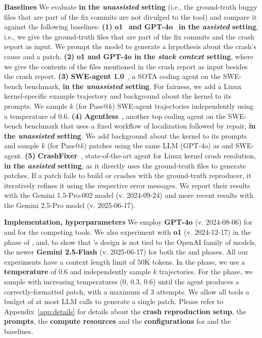 \noindent\textbf{Baselines}
We evaluate \textbf{\cresearcher{} in the \emph{unassisted} setting} (i.e., the ground-truth buggy files that are part of the fix commits are not divulged to the tool) and compare it against the following baselines:
\textbf{(1)} \textbf{o1}~\citep{o1} \textbf{and GPT-4o}~\citep{gpt4o} \textbf{in the \emph{assisted} setting}, i.e., we give the ground-truth files that are part of the fix commits and the crash report as input. We prompt the model to generate a hypothesis about the crash's cause and a patch.
\textbf{(2)} \textbf{o1 and GPT-4o in the \emph{stack context} setting}, where we give the contents of the files mentioned in the crash report as input besides the crash report. 
\textbf{(3)} \textbf{SWE-agent 1.0}~\citep{yang2024sweagentagentcomputerinterfacesenable}, a SOTA coding agent on the SWE-bench benchmark, \textbf{in the \emph{unassisted} setting}.
For fairness, we add a Linux kernel-specific example trajectory and background about the kernel to its prompts.
We sample $k$ (for Pass@$k$) SWE-agent trajectories independently using a temperature of $0.6$.
\textbf{(4)} \textbf{Agentless}~\citep{xia2024agentlessdemystifyingllmbasedsoftware}, another top coding agent on the SWE-bench benchmark that uses a fixed workflow of localization followed by repair, \textbf{in the \emph{unassisted} setting}. We add background about the kernel to its prompts and sample $k$ (for Pass@$k$) patches using the same LLM (GPT-4o) as \cresearcher{} and SWE-agent. 
\textbf{(5)} \textbf{CrashFixer}~\citep{crashfixer}, state-of-the-art agent for Linux kernel crash resolution, \textbf{in the \textit{assisted} setting}, as it directly uses the ground-truth files to generate patches. If a patch fails to build or crashes with the ground-truth reproducer, it iteratively refines it using the respective error messages. We report their results with the Gemini 1.5-Pro-002 model (v. 2024-09-24) and more recent results with the Gemini 2.5-Pro model (v. 2025-06-17).

\noindent\textbf{Implementation, hyperparameters}
We employ \textbf{GPT-4o} (v. 2024-08-06) for \cresearcher{} and for the competing tools. We also experiment with \textbf{o1} (v. 2024-12-17) in the \synthesisphase{} phase of \cresearcher{}, and,
to show that \cresearcher{}'s design is not tied to the OpenAI family of models, the newer \textbf{Gemini 2.5-Flash} (v. 2025-06-17) for both the \analysisphase{} and \synthesisphase{} phases.
All our experiments have a context length limit of $50$K tokens.
In the \analysisphase{} phase, we use a \textbf{temperature} of $0.6$ and independently sample $k$ trajectories.
For the \synthesisphase{} phase, we sample with increasing temperatures ($0$, $0.3$, $0.6$) until the agent produces a correctly-formatted patch, with a maximum of $3$ attempts.
We allow all tools a budget of at most \textbf{\maxcalls{}} LLM calls to generate a single patch.
Please refer to Appendix~\ref{app:details} for details about the \textbf{crash reproduction setup}, the \textbf{prompts}, the \textbf{compute resources} and the \textbf{configurations} for \cresearcher{} and the baselines.
